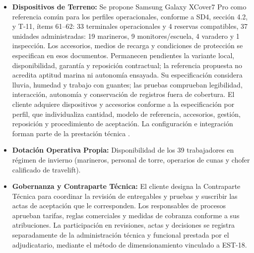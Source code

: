 \begin{itemize}
    \item \textbf{Dispositivos de Terreno:} Se propone Samsung Galaxy XCover7 Pro como referencia común para los perfiles operacionales, conforme a SD4, sección 4.2, y T-11, ítems 61--62: 33 terminales operacionales y 4 reservas compatibles, 37 unidades administradas: 19 marineros, 9 monitores/escuela, 4 varadero y 1 inspección. Los accesorios, medios de recarga y condiciones de protección se especifican en esos documentos. Permanecen pendientes la variante local, disponibilidad, garantía y reposición contractual; la referencia propuesta no acredita aptitud marina ni autonomía ensayada. Su especificación considera lluvia, humedad y trabajo con guantes; las pruebas comprueban legibilidad, interacción, autonomía y conservación de registros fuera de cobertura. El cliente adquiere dispositivos y accesorios conforme a la especificación por perfil, que individualiza cantidad, modelo de referencia, accesorios, gestión, reposición y procedimiento de aceptación. La configuración e integración forman parte de la prestación técnica \parencite[cap.~15, RT-03.10 y RT-12.11]{caso07}.
    \item \textbf{Dotación Operativa Propia:} Disponibilidad de los 39 trabajadores en régimen de invierno (marineros, personal de torre, operarios de cunas y chofer calificado de travelift).
    \item \textbf{Gobernanza y Contraparte Técnica:} El cliente designa la Contraparte Técnica para coordinar la revisión de entregables y pruebas y suscribir las actas de aceptación que le corresponden. Los responsables de procesos aprueban tarifas, reglas comerciales y medidas de cobranza conforme a sus atribuciones. La participación en revisiones, actas y decisiones se registra separadamente de la administración técnica y funcional prestada por el adjudicatario, mediante el método de dimensionamiento vinculado a EST-18.
\end{itemize}

